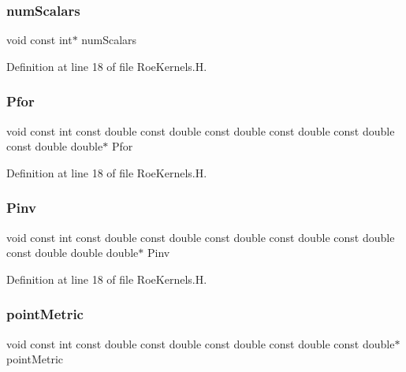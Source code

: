 \subsubsection{\texorpdfstring{num\+Scalars}{numScalars}}
{\footnotesize\ttfamily void const int$\ast$ num\+Scalars}



Definition at line 18 of file Roe\+Kernels.\+H.

\hypertarget{RoeKernels_8H_a15dafdc1823a1c1281057d840bfdcda6}{}\label{RoeKernels_8H_a15dafdc1823a1c1281057d840bfdcda6} 
\subsubsection{\texorpdfstring{Pfor}{Pfor}}
{\footnotesize\ttfamily void const int const double const double const double const double const double const double double$\ast$ Pfor}



Definition at line 18 of file Roe\+Kernels.\+H.

\hypertarget{RoeKernels_8H_a399ec13188834ab2fbeb1b2e02def95d}{}\label{RoeKernels_8H_a399ec13188834ab2fbeb1b2e02def95d} 
\subsubsection{\texorpdfstring{Pinv}{Pinv}}
{\footnotesize\ttfamily void const int const double const double const double const double const double const double double double$\ast$ Pinv}



Definition at line 18 of file Roe\+Kernels.\+H.

\hypertarget{RoeKernels_8H_a3ef779535ff22c94cec7a43794047e9d}{}\label{RoeKernels_8H_a3ef779535ff22c94cec7a43794047e9d} 
\subsubsection{\texorpdfstring{point\+Metric}{pointMetric}}
{\footnotesize\ttfamily void const int const double const double const double const double const double$\ast$ point\+Metric}



